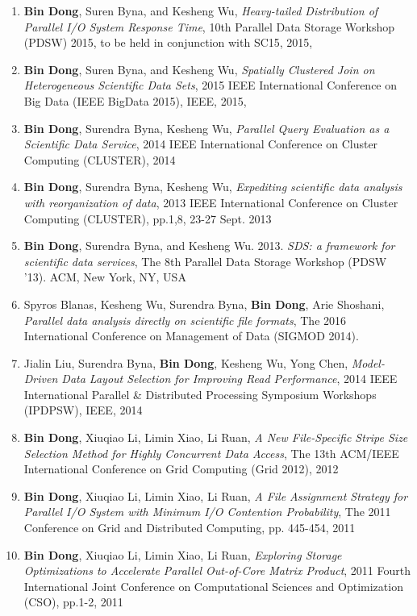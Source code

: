 \documentclass[letterpaper,11pt]{article}
\begin{document}
\begin{enumerate}[1)]
\item \textbf{Bin Dong}, Suren Byna, and Kesheng Wu, \textit{Heavy-tailed Distribution of Parallel I/O System Response Time}, 10th Parallel Data Storage Workshop (PDSW) 2015, to be held in conjunction with SC15, 2015,
\item \textbf{Bin Dong}, Suren Byna, and Kesheng Wu, \textit{Spatially Clustered Join on Heterogeneous Scientific Data Sets}, 2015 IEEE International Conference on Big Data (IEEE BigData 2015), IEEE, 2015,
\item \textbf{Bin Dong}, Surendra Byna, Kesheng Wu, \textit{Parallel Query Evaluation as a Scientific Data Service}, 2014 IEEE International Conference on Cluster Computing (CLUSTER), 2014 
\item \textbf{Bin Dong}, Surendra Byna, Kesheng Wu, \textit{Expediting scientific data analysis with reorganization of data}, 2013 IEEE International Conference on Cluster Computing (CLUSTER), pp.1,8, 23-27 Sept. 2013
\item \textbf{Bin Dong}, Surendra Byna, and Kesheng Wu. 2013. \textit{SDS: a framework for scientific data services}, The 8th Parallel Data Storage Workshop (PDSW '13). ACM, New York, NY, USA
\item Spyros Blanas, Kesheng Wu, Surendra Byna, \textbf{Bin Dong}, Arie Shoshani, \textit{Parallel data analysis directly on scientific file formats},  The 2016 International Conference on Management of Data (SIGMOD 2014). 
\item Jialin Liu, Surendra Byna, \textbf{Bin Dong}, Kesheng Wu, Yong Chen, \textit{Model-Driven Data Layout Selection for Improving Read Performance}, 2014 IEEE International Parallel \& Distributed Processing Symposium Workshops (IPDPSW), IEEE, 2014
\item \textbf{Bin Dong}, Xiuqiao Li, Limin Xiao, Li Ruan, \textit{A New File-Specific Stripe Size Selection Method for Highly Concurrent Data Access}, The 13th ACM/IEEE International Conference on Grid Computing (Grid 2012), 2012
\item \textbf{Bin Dong}, Xiuqiao Li, Limin Xiao, Li Ruan, {\it A File Assignment Strategy for Parallel I/O System with Minimum I/O Contention Probability}, The 2011 Conference on Grid and Distributed Computing, pp. 445-454, 2011 
\item \textbf{Bin Dong}, Xiuqiao Li, Limin Xiao, Li Ruan, {\it Exploring Storage Optimizations to Accelerate Parallel Out-of-Core Matrix Product},  2011 Fourth International Joint Conference on Computational Sciences and Optimization (CSO), pp.1-2, 2011 

\end{enumerate}
\end{document}
